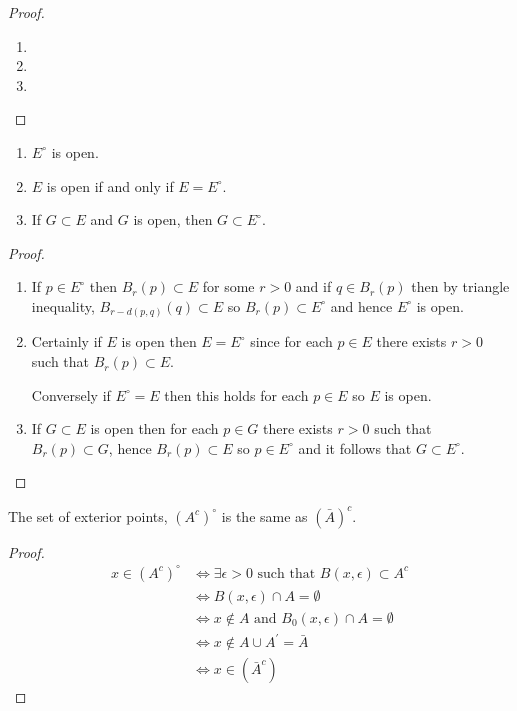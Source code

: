 \begin{proof} \
\begin{enumerate}[label=(\arabic*)]
\item 
\item 
\item 
\end{enumerate}
\end{proof}

\begin{proposition}
\begin{enumerate}[label=(\arabic*)]
\item $E^\circ$ is open.
\item $E$ is open if and only if $E=E^\circ$.
\item If $G\subset E$ and $G$ is open, then $G\subset E^\circ$.
\end{enumerate}
\end{proposition}

\begin{proof} \
\begin{enumerate}[label=(\arabic*)]
\item If $p\in E^\circ$ then $B_r(p)\subset E$ for some $r>0$ and if $q\in B_r(p)$ then by triangle inequality, $B_{r-d(p, q)}(q)\subset E$ so $B_r(p)\subset E^\circ$ and
hence $E^\circ$ is open.

\item Certainly if $E$ is open then $E=E^\circ$ since for each $p\in E$ there exists $r>0$ such that $B_r(p)\subset E$.

Conversely if $E^\circ=E$ then this holds for each $p\in E$ so $E$ is open.

\item If $G\subset E$ is open then for each $p\in G$ there exists $r>0$ such that
$B_r(p)\subset G$, hence $B_r(p)\subset E$ so $p\in E^\circ$ and it follows that $G\subset E^\circ$.
\end{enumerate}
\end{proof}

\begin{proposition}
The set of exterior points, $(A^c)^\circ$ is the same as $(\bar{A})^c$.
\end{proposition}

\begin{proof}
\begin{align*}
x \in (A^c)^\circ 
&\iff \exists \epsilon>0 \text{ such that } B(x,\epsilon) \subset A^c \\
&\iff B(x,\epsilon) \cap A = \emptyset \\
&\iff x \notin A \text{ and } B_0(x,\epsilon) \cap A=\emptyset \\
&\iff x \notin A \cup A^\prime = \bar A \\
&\iff x \in (\bar A^c)
\end{align*}
\end{proof}

